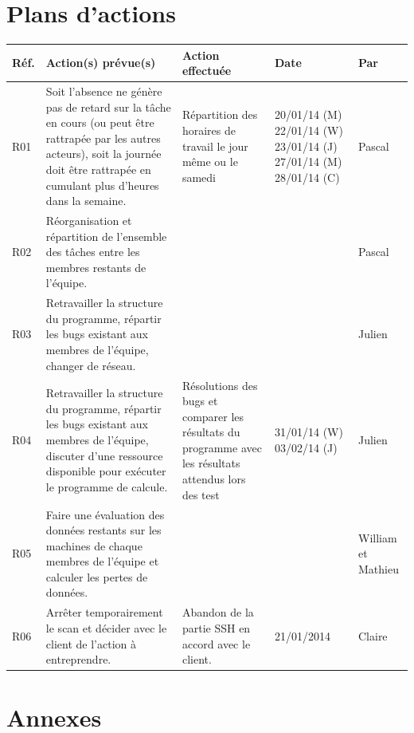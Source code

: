 \documentclass[a4paper,11pt,french]{article}
\begin{document}
\section{Plans d'actions}
\begin{center}
\begin{tabular}{|l|p{7cm}|p{5cm}|p{2.5cm}|p{1.5cm}|}
\hline
\textbf{Réf.}&\textbf{Action(s) prévue(s)}&\textbf{Action effectuée}&\textbf{Date}&\textbf{Par}\\
\hline
        R01 &
        Soit l'absence ne génère pas de retard sur la tâche en cours (ou peut être rattrapée par les autres acteurs), soit la journée doit être rattrapée en cumulant plus d'heures dans la semaine.
         & Répartition des horaires de travail le jour même ou le samedi & 20/01/14 (M) 22/01/14 (W) 23/01/14 (J) 27/01/14 (M) 28/01/14 (C) & Pascal \\
\hline
        R02 &
        	Réorganisation et répartition de l'ensemble des tâches entre les membres restants de l'équipe.
         & & & Pascal\\
\hline
        R03 &
        Retravailler la structure du programme, répartir les bugs existant aux membres de l'équipe, changer de réseau. & & & Julien\\
\hline
R04 &
        Retravailler la structure du programme, répartir les bugs existant aux membres de l'équipe, discuter d'une ressource disponible pour exécuter le programme de calcule.& 
        Résolutions des bugs et comparer les résultats du programme avec les résultats attendus lors des test& 
        31/01/14 (W)
        03/02/14 (J) & Julien\\
\hline
R05 &
        Faire une évaluation des données restants sur les machines de chaque membres de l'équipe et calculer les pertes de données. & & & William et Mathieu\\
\hline
R06 & Arrêter temporairement le scan et décider avec le client de l'action à entreprendre. & Abandon de la partie SSH en accord avec le client. & 21/01/2014 & Claire\\
\hline
\end{tabular}
\end{center}
\newpage
\section{Annexes}
\end{document}
